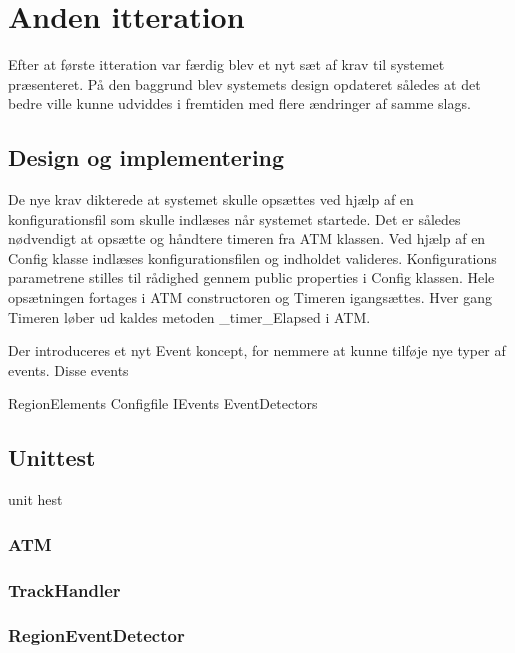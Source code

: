 \thispagestyle{fancy}
\chapter{Anden itteration}
\label{chp:seconditteration}
Efter at første itteration var færdig blev et nyt sæt af krav til systemet præsenteret. På den baggrund blev systemets design opdateret således at det bedre ville kunne udviddes i fremtiden med flere ændringer af samme slags. 

\section{Design og implementering}
De nye krav dikterede at systemet skulle opsættes ved hjælp af en konfigurationsfil som skulle indlæses når systemet startede. Det er således nødvendigt at opsætte og håndtere timeren fra ATM klassen. Ved hjælp af en Config klasse indlæses konfigurationsfilen og indholdet valideres. Konfigurations parametrene stilles til rådighed gennem public properties i Config klassen. Hele opsætningen fortages i ATM constructoren og Timeren igangsættes. Hver gang Timeren løber ud kaldes metoden \_timer\_Elapsed i ATM. 

Der introduceres et nyt Event koncept, for nemmere at kunne tilføje nye typer af events. Disse events 


RegionElements
Configfile
IEvents
EventDetectors



\section{Unittest}
unit hest
\subsection{ATM}
\subsection{TrackHandler}
\subsection{RegionEventDetector}
